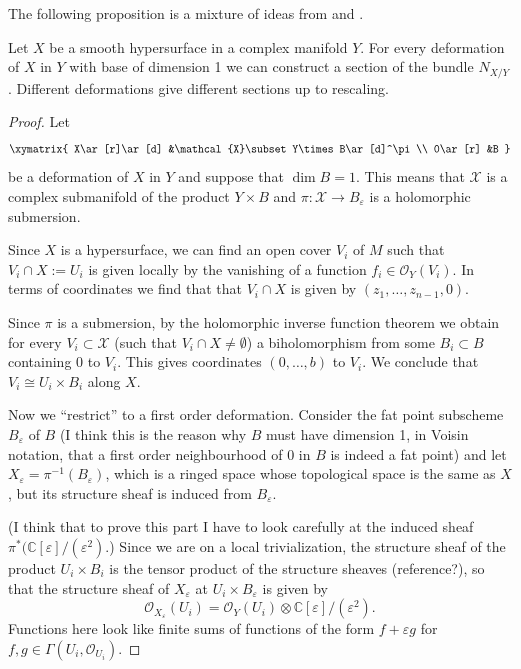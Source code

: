 \documentclass{book}
\begin{document}
{The following proposition is a
mixture of ideas from \cite[p. 224]{voi}
and \cite[Examples
3.2.4(ii)]{Sernesi-deformations}.

\begin{proposition}
\label{proposition-kodai-spenc-embed-defor}
Let $X$ be a smooth hypersurface in a complex
manifold $Y$.
For every deformation of $X$ in $Y$
with base of dimension 1 we can construct a
section of the bundle
$N_{X/Y}$. Different deformations give
different sections up to rescaling.
\end{proposition}

\begin{proof}
Let
$$
\xymatrix{
X\ar[r]\ar[d]
&\mathcal{X}\subset Y\times B\ar[d]^\pi\\
0\ar[r]
&B
}
$$
be a deformation of $X$ in $Y$
and suppose that $\dim B=1$.
This means that $\mathcal{X}$ is a complex
submanifold of
the product $Y \times B$
and $\pi:\mathcal{X} \to B_\varepsilon$ is
a holomorphic submersion.

Since $X$ is a hypersurface,
we can find an open cover $V_i$
of $M$ such that $V_i \cap X:= U_i$
is given locally by the vanishing of
a function $f_i \in \mathcal{O}_Y(V_i)$.
In terms of coordinates we find that
that $V_i \cap X$ is given by
$(z_1,…,z_{n-1},0)$.

Since $\pi$ is a submersion,
by the holomorphic inverse function theorem
we obtain for every $V_i \subset \mathcal{X}$
(such that $V_i \cap X \neq  \emptyset$)
a biholomorphism from some $B_i \subset B$
containing $0$ to $V_i$.
This gives coordinates $(0,…,b)$ to $V_i$.
We conclude that $V_i \cong U_i\times B_i$
along $X$.

Now we ``restrict'' to a first order
deformation.
Consider the fat point subscheme
$B_\varepsilon$ of $B$
(I think this is the reason why $B$ must have
dimension 1,
in Voisin notation, that a first order
neighbourhood
of $0$ in $B$ is indeed a fat point)
and let
$X_\varepsilon=\pi^{-1}(B_\varepsilon)$,
which is a ringed space whose topological
space
is the same as $X$, but its
structure sheaf is induced from
$B_\varepsilon$.

(I think that to prove this part I have
to look carefully at the induced sheaf
$\pi^*(\mathbb{C}[\varepsilon]/
(\varepsilon^2)$.)
Since we are on a local trivialization,
the structure sheaf of the product $U_i
\times B_i$
is the tensor product of the structure
sheaves
(reference?),
so that the structure sheaf of
$X_\varepsilon$ at
$U_i\times B_\varepsilon$ is given by
$$
\mathcal{O}_{X_\varepsilon}(U_i)=
 \mathcal{O}_Y(U_i) \otimes
 \mathbb{C}[\varepsilon]/(\varepsilon^2).
$$
Functions here look like finite sums of
functions of the form $f+ \varepsilon g$ for
$f,g \in \Gamma(U_i,\mathcal{O}_{U_i})$.


\end{proof}}
\end{document}
